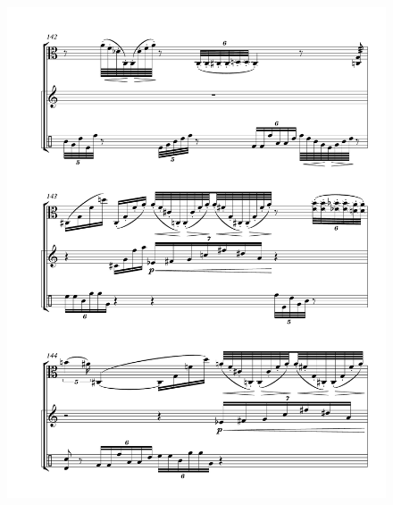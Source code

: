\begin{figure}[htbp]
    \centering
	\includegraphics[width=6.5in]{figures/Viola_Percussion_21.pdf}
\end{figure}

